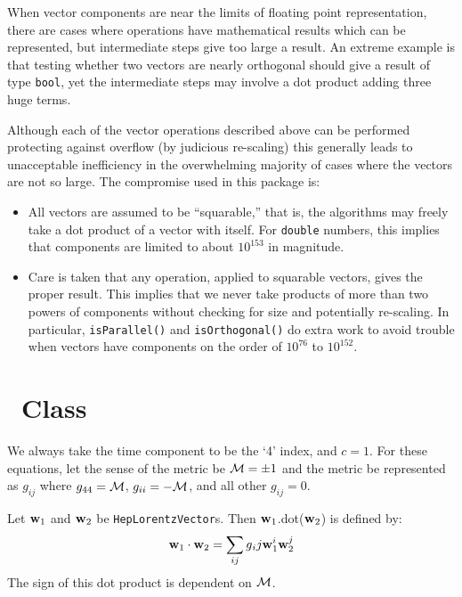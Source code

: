\documentclass[twoside,12pt]{article}
\def \LV {{\tt HepLorentzVector}}
\begin{document}
When vector components are near the limits of floating point representation,
there are cases where operations have mathematical results which can be
represented, but intermediate steps give too large a result.  An extreme
example is that testing whether two vectors are nearly orthogonal should give
a result of type \verb$bool$, yet the intermediate steps may involve a dot
product adding three huge terms.

\noindent
Although each of the vector operations described above can be performed
protecting against overflow (by judicious re-scaling) this generally leads
to unacceptable inefficiency in the overwhelming majority of cases where the
vectors are not so large.  The compromise used in this package is:

\begin{itemize}
\item All vectors are assumed to be ``squarable,'' that is, the algorithms
may freely take a dot product of a vector with itself.  For \verb$double$
numbers, this implies that components are limited to about $10^{153}$
in magnitude.
\item Care is taken that any operation, applied to squarable vectors, gives
the proper result.  This implies that we never take products of more than two
powers of components without checking for size and potentially re-scaling.
In particular, {\tt isParallel()} and {\tt isOrthogonal()} do extra work 
to avoid trouble when vectors have components on the order of $10^{76}$ to
$10^{152}$. 
\end{itemize}

\section{\protect\LV\ Class}

We always take the time component to be the `4' index, and $c = 1$.
For these equations, let the sense of the metric be $ {\cal M} = \pm 1$ and
the metric be represented as $g_{ij}$ where $g_{44} = {\cal M}$,
$g_{ii} = -{\cal M}$, and all other $g_{ij} = 0$.

\noindent
Let ${\bf w}_{1}$ and ${\bf w}_{2}$ be \LV s.
Then ${\bf w}_{1}$.dot(${\bf w}_{2}$) is defined by:
\begin{equation}
\label{eq:wdot}
  {\bf w}_{1} \cdot {\bf w}_{2} = \sum_{ij} g{_ij}
{\bf w}_{1}^{i} {\bf w}_{2}^{j} \\
\end{equation}
\noindent
The sign of this dot product is dependent on $\cal M$.
\end{document}
